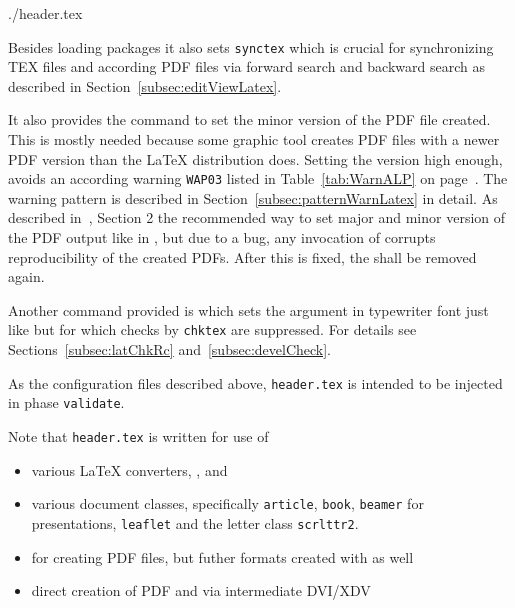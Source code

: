 %

{./header.tex}%

Besides loading packages it also sets \texttt{synctex} 
which is crucial for synchronizing TEX files and according PDF files 
via forward search and backward search 
as described in Section~\ref{subsec:editViewLatex}. 


It also provides the command  to set the minor version of the PDF file created. 
This is mostly needed because some graphic tool creates PDF files with a newer PDF version 
than the \LaTeX{} distribution does. 
Setting the version high enough, avoids an according warning \texttt{WAP03} 
listed in Table~\ref{tab:WarnALP} on page~\pageref{tab:WarnALP}. 
The warning pattern is described in Section~\ref{subsec:patternWarnLatex} in detail. 
As described in~\cite{DocMetaDataSuppCode}, Section 2 
the recommended way to set major and minor version of the PDF output 
like in , 
but due to a bug, any invocation of  corrupts reproducibility of the created PDFs. 
After this is fixed, the  shall be removed again. 

Another command provided is  which sets the argument in typewriter font 
just like  but for which checks by \texttt{chktex} are suppressed. 
For details see Sections~\ref{subsec:latChkRc} and~\ref{subsec:develCheck}. 
\medskip


As the configuration files described above, 
\texttt{header.tex} is intended to be injected in phase \texttt{validate}. 

Note that \texttt{header.tex} is written for use of 
%
\begin{itemize}
  \item various \LaTeX{} converters, \lualatex, \xelatex{} and \pdflatex{} 
  \item various document classes, 
  specifically \texttt{article}, \texttt{book}, \texttt{beamer} for presentations, 
  \texttt{leaflet} and the letter class \texttt{scrlttr2}. 
  \item for creating PDF files, but futher formats created with  as well
  \item direct creation of PDF and via intermediate DVI/XDV 
\end{itemize}


